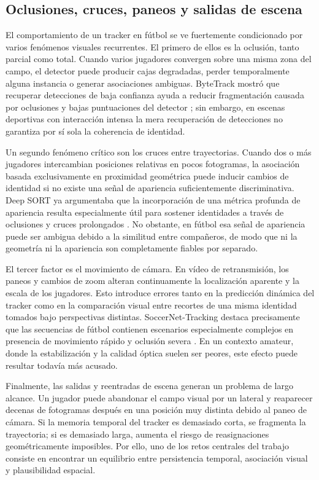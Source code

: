 \documentclass[../MAIN.tex]{subfiles}
\begin{document}
\subsection{Oclusiones, cruces, paneos y salidas de escena}

El comportamiento de un tracker en fútbol se ve fuertemente condicionado por varios fenómenos visuales recurrentes. El primero de ellos es la oclusión, tanto parcial como total. Cuando varios jugadores convergen sobre una misma zona del campo, el detector puede producir cajas degradadas, perder temporalmente alguna instancia o generar asociaciones ambiguas. ByteTrack mostró que recuperar detecciones de baja confianza ayuda a reducir fragmentación causada por oclusiones y bajas puntuaciones del detector \parencite{zhang2022bytetrack}; sin embargo, en escenas deportivas con interacción intensa la mera recuperación de detecciones no garantiza por sí sola la coherencia de identidad.

Un segundo fenómeno crítico son los cruces entre trayectorias. Cuando dos o más jugadores intercambian posiciones relativas en pocos fotogramas, la asociación basada exclusivamente en proximidad geométrica puede inducir cambios de identidad si no existe una señal de apariencia suficientemente discriminativa. Deep SORT ya argumentaba que la incorporación de una métrica profunda de apariencia resulta especialmente útil para sostener identidades a través de oclusiones y cruces prolongados \parencite{wojke2017deepsort}. No obstante, en fútbol esa señal de apariencia puede ser ambigua debido a la similitud entre compañeros, de modo que ni la geometría ni la apariencia son completamente fiables por separado.

El tercer factor es el movimiento de cámara. En vídeo de retransmisión, los paneos y cambios de zoom alteran continuamente la localización aparente y la escala de los jugadores. Esto introduce errores tanto en la predicción dinámica del tracker como en la comparación visual entre recortes de una misma identidad tomados bajo perspectivas distintas. SoccerNet-Tracking destaca precisamente que las secuencias de fútbol contienen escenarios especialmente complejos en presencia de movimiento rápido y oclusión severa \parencite{cioppa2022soccernettracking}. En un contexto amateur, donde la estabilización y la calidad óptica suelen ser peores, este efecto puede resultar todavía más acusado.

Finalmente, las salidas y reentradas de escena generan un problema de largo alcance. Un jugador puede abandonar el campo visual por un lateral y reaparecer decenas de fotogramas después en una posición muy distinta debido al paneo de cámara. Si la memoria temporal del tracker es demasiado corta, se fragmenta la trayectoria; si es demasiado larga, aumenta el riesgo de reasignaciones geométricamente imposibles. Por ello, uno de los retos centrales del trabajo consiste en encontrar un equilibrio entre persistencia temporal, asociación visual y plausibilidad espacial.
\end{document}
